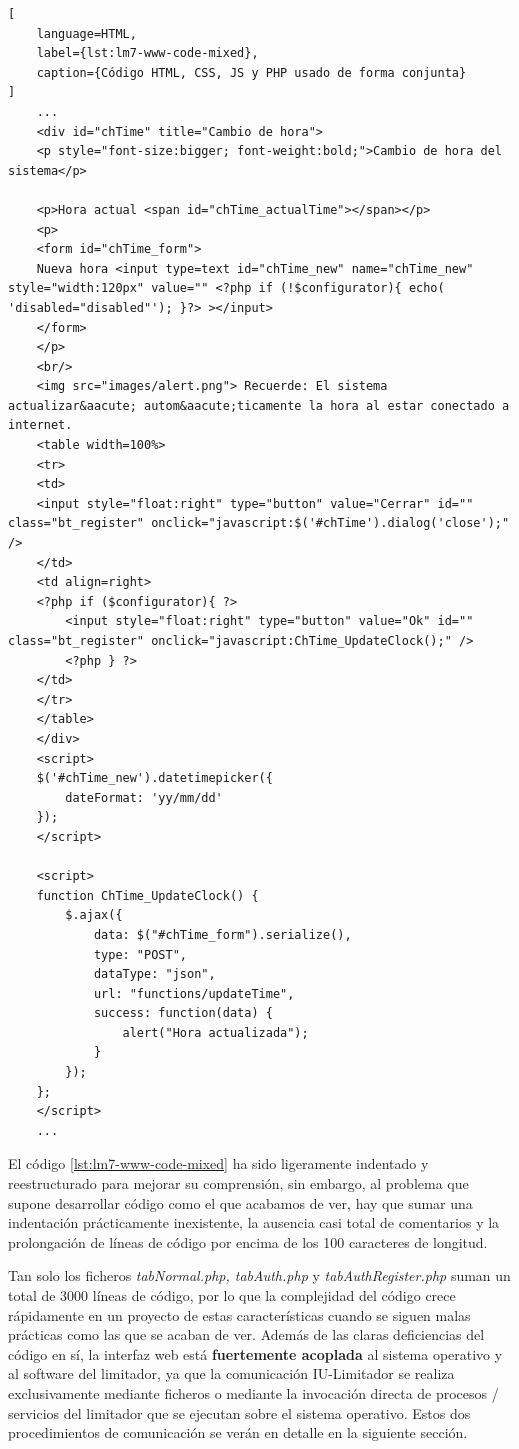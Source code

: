 \begin{lstlisting}[
    language=HTML,
    label={lst:lm7-www-code-mixed},
    caption={Código HTML, CSS, JS y PHP usado de forma conjunta}
]
    ...
    <div id="chTime" title="Cambio de hora">
    <p style="font-size:bigger; font-weight:bold;">Cambio de hora del sistema</p>

    <p>Hora actual <span id="chTime_actualTime"></span></p>
    <p>
    <form id="chTime_form">
    Nueva hora <input type=text id="chTime_new" name="chTime_new" style="width:120px" value="" <?php if (!$configurator){ echo( 'disabled="disabled"'); }?> ></input>
    </form>
    </p>
    <br/>
    <img src="images/alert.png"> Recuerde: El sistema actualizar&aacute; autom&aacute;ticamente la hora al estar conectado a internet.
    <table width=100%>
    <tr>
    <td>
    <input style="float:right" type="button" value="Cerrar" id="" class="bt_register" onclick="javascript:$('#chTime').dialog('close');" />
    </td>
    <td align=right>
    <?php if ($configurator){ ?>
        <input style="float:right" type="button" value="Ok" id="" class="bt_register" onclick="javascript:ChTime_UpdateClock();" />
        <?php } ?>
    </td>
    </tr>
    </table>
    </div>
    <script>
    $('#chTime_new').datetimepicker({
        dateFormat: 'yy/mm/dd'
    });
    </script>

    <script>
    function ChTime_UpdateClock() {
        $.ajax({
            data: $("#chTime_form").serialize(),
            type: "POST",
            dataType: "json",
            url: "functions/updateTime",
            success: function(data) {
                alert("Hora actualizada");
            }
        });
    };
    </script>
    ...
\end{lstlisting}

El código \ref{lst:lm7-www-code-mixed} ha sido ligeramente indentado y reestructurado para mejorar su comprensión, sin embargo, al problema que supone desarrollar código como el que acabamos de ver, hay que sumar una indentación prácticamente inexistente, la ausencia casi total de comentarios y la prolongación de líneas de código por encima de los 100 caracteres de longitud.

Tan solo los ficheros \textit{tabNormal.php, tabAuth.php} y \textit{tabAuthRegister.php} suman un total de 3000 líneas de código, por lo que la complejidad del código crece rápidamente en un proyecto de estas características cuando se siguen malas prácticas como las que se acaban de ver. Además de las claras deficiencias del código en sí, la interfaz web está \textbf{fuertemente acoplada} al sistema operativo y al software del limitador, ya que la comunicación IU-Limitador se realiza exclusivamente mediante ficheros o mediante la invocación directa de procesos / servicios del limitador que se ejecutan sobre el sistema operativo. Estos dos procedimientos de comunicación se verán en detalle en la siguiente sección.

